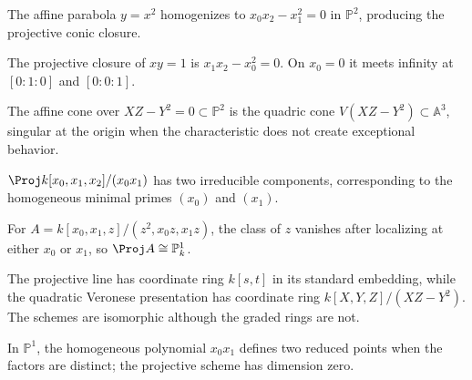 \begin{example}\label{ex:vi37-10}
The affine parabola \(y=x^2\) homogenizes to \(x_0x_2-x_1^2=0\) in \(\mathbb P^2\), producing the projective conic closure.
\end{example}

\begin{example}\label{ex:vi37-11}
The projective closure of \(xy=1\) is \(x_1x_2-x_0^2=0\).  On \(x_0=0\) it meets infinity at \([0:1:0]\) and \([0:0:1]\).
\end{example}

\begin{example}\label{ex:vi37-12}
The affine cone over \(XZ-Y^2=0\subset\mathbb P^2\) is the quadric cone \(V(XZ-Y^2)\subset\mathbb A^3\), singular at the origin when the characteristic does not create exceptional behavior.
\end{example}

\begin{example}\label{ex:vi37-13}
\(\Proj k[x_0,x_1,x_2]/(x_0x_1)\) has two irreducible components, corresponding to the homogeneous minimal primes \((x_0)\) and \((x_1)\).
\end{example}

\begin{example}\label{ex:vi37-14}
For \(A=k[x_0,x_1,z]/(z^2,x_0z,x_1z)\), the class of \(z\) vanishes after localizing at either \(x_0\) or \(x_1\), so \(\Proj A\cong\mathbb P^1_k\).
\end{example}

\begin{example}\label{ex:vi37-15}
The projective line has coordinate ring \(k[s,t]\) in its standard embedding, while the quadratic Veronese presentation has coordinate ring \(k[X,Y,Z]/(XZ-Y^2)\).  The schemes are isomorphic although the graded rings are not.
\end{example}

\begin{example}\label{ex:vi37-16}
In \(\mathbb P^1\), the homogeneous polynomial \(x_0x_1\) defines two reduced points when the factors are distinct; the projective scheme has dimension zero.
\end{example}
